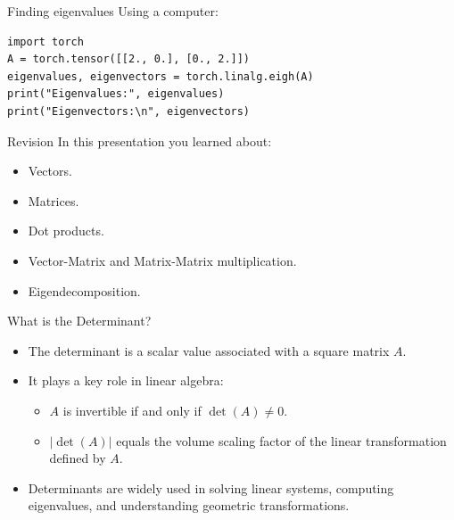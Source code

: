 \documentclass{beamer}
\begin{document}
\begin{frame}[fragile]{Finding eigenvalues}
Using a computer:
\begin{lstlisting}
import torch
A = torch.tensor([[2., 0.], [0., 2.]])
eigenvalues, eigenvectors = torch.linalg.eigh(A)
print("Eigenvalues:", eigenvalues)
print("Eigenvectors:\n", eigenvectors)
\end{lstlisting}
\end{frame}

\begin{frame}{Revision}
In this presentation you learned about:
    \begin{itemize}
        \item Vectors.
        \item Matrices.
        \item Dot products.
        \item Vector-Matrix and Matrix-Matrix multiplication.
        \item Eigendecomposition.
    \end{itemize}
    
\end{frame}

\begin{frame}{What is the Determinant?}
\begin{itemize}
  \item The determinant is a scalar value associated with a square matrix \( A \).
  \item It plays a key role in linear algebra:
  \begin{itemize}
    \item \( A \) is invertible if and only if \( \det(A) \neq 0 \).
    \item \( |\det(A)| \) equals the volume scaling factor of the linear transformation defined by \( A \).
  \end{itemize}
  \item Determinants are widely used in solving linear systems, computing eigenvalues, and understanding geometric transformations.
\end{itemize}
\end{frame}
\end{document}

